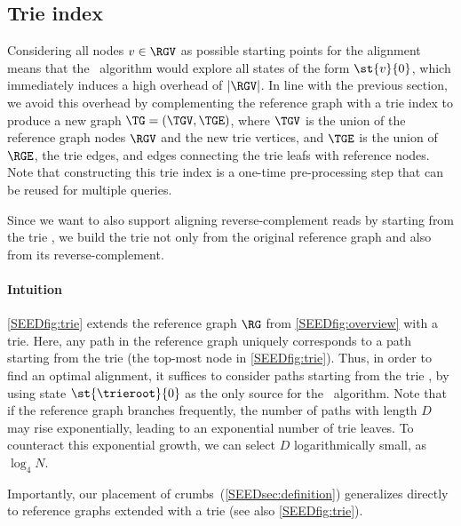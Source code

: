 

\subsection{Trie index} \label{SEEDsec:trie}
%
Considering all nodes $v \in \RGV$ as possible starting points for the alignment
means that the \A~algorithm would explore all states of the form $\st{v}{0}$,
which immediately induces a high overhead of $\lvert \RGV \rvert$.
%
In line with the previous section, we avoid this overhead by complementing the
reference graph with a trie index to produce a new graph $\TG = (\TGV, \TGE)$,
where $\TGV$ is the union of the reference graph nodes $\RGV$ and the new trie
vertices, and $\TGE$ is the union of $\RGE$, the trie edges, and edges
connecting the trie leafs with reference nodes. Note that constructing this trie
index is a one-time pre-processing step that can be reused for multiple queries.

Since we want to also support aligning reverse-complement reads by starting from
the trie \trieroot{}, we build the trie not only from the original reference
graph and also from its reverse-complement.

\paragraph{Intuition}
%
\cref{SEEDfig:trie} extends the reference graph $\RG$ from \cref{SEEDfig:overview} with
a trie. Here, any path in the reference graph uniquely corresponds to a path
starting from the trie \trieroot{} (the top-most node in \cref{SEEDfig:trie}). Thus,
in order to find an optimal alignment, it suffices to consider paths starting
from the trie \trieroot{}, by using state $\st{\trieroot}{0}$ as the only source
for the \A~algorithm.
%
Note that if the reference graph branches frequently, the number of paths with
length $D$ may rise exponentially, leading to an exponential number of trie
leaves. To counteract this exponential growth, we can select $D$ logarithmically
small, as $\log_4N$.

Importantly, our placement of crumbs~(\cref{SEEDsec:definition}) generalizes
directly to reference graphs extended with a trie (see also
\cref{SEEDfig:trie}).


